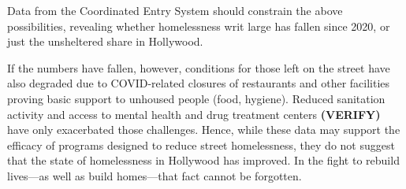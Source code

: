 \documentclass[11pt]{article}
\def\bfr{\bf\color{red}}
\begin{document}
Data from the Coordinated Entry System should constrain the above possibilities, revealing whether homelessness 
writ large has fallen since 2020, or just the unsheltered share in Hollywood.

If the numbers have fallen, however, conditions for those left on the street have also degraded due to COVID-related 
closures of restaurants and other facilities proving basic support to unhoused people (food, hygiene). Reduced sanitation 
activity and access to mental health and drug treatment centers {\bfr (VERIFY)} have only exacerbated those challenges. 
Hence, while these data may support the efficacy of programs designed to reduce street homelessness, they do not suggest 
that the state of homelessness in Hollywood has improved. In the fight to rebuild lives---as well as build homes---that fact 
cannot be forgotten.

%


%
%
%
\end{document}
